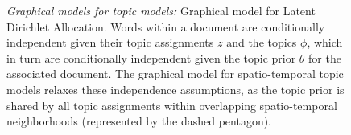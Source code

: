 \begin{figure}
	\begin{center}
		 \hfill
	\end{center}
	\caption{
		\emph{Graphical models for topic models:}
		\protect{} Graphical model for Latent Dirichlet Allocation. Words within a document are conditionally independent given their topic assignments $z$ and the topics $\phi$, which in turn are conditionally independent given the topic prior $\theta$ for the associated document.
		\protect{} The graphical model for spatio-temporal topic models relaxes these independence assumptions, as the topic prior is shared by all topic assignments within overlapping spatio-temporal neighborhoods (represented by the dashed pentagon).
	}
	\label{fig:pgms}
\end{figure}

